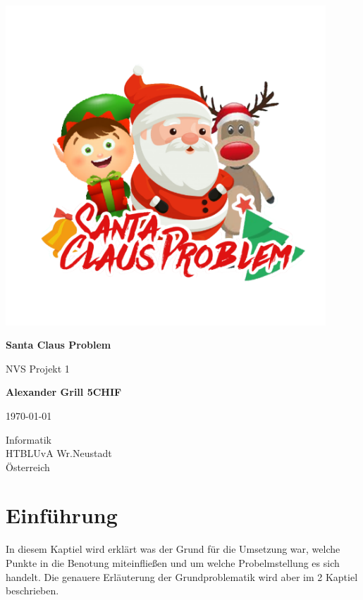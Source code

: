 \documentclass[a4paper,12pt]{exam}
\begin{document}
\begin{titlepage}
    \begin{center}
        \vspace*{1cm}
        \includegraphics[width=12cm]{Logo.png}
        
        \textbf{\huge Santa Claus Problem}
        
        \vspace{0.5cm}
        NVS Projekt 1
                 
        \vspace{1.0cm}
    
        \textbf{Alexander Grill 5CHIF}
        
        \today
        
        \vfill
                 
                 
        \vspace{0.5cm}
                 
        Informatik\\
        HTBLUvA Wr.Neustadt\\
        Österreich\\

                 
    \end{center}
\end{titlepage}  


\newpage
\tableofcontents
\newpage

\section{Einführung}
 In diesem Kaptiel wird erklärt was der Grund für die Umsetzung war, welche Punkte in die Benotung miteinfließen und um welche Probelmstellung es sich handelt. Die genauere Erläuterung
 der Grundproblematik wird aber im 2 Kaptiel beschrieben.
\end{document}
